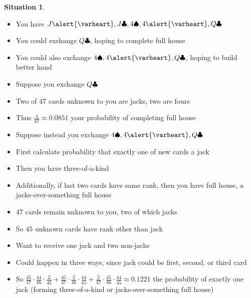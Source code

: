 \documentclass{beamer}
\theoremstyle{definition}
\newtheorem{situation}{Situation}
\newcommand{\hs}{\alert{\varheart}}
\newcommand{\s}{\spadesuit}
\newcommand{\cs}{\clubsuit}
\begin{document}
\begin{frame}
\begin{situation}
\begin{itemize}
\item You have $J\hs,J\cs,4\s,4\hs,Q\cs$
\item You could exchange $Q\cs$, hoping to complete full house
\item You could also exchange $4\s,4\hs,Q\cs$, hoping to build better hand
\end{itemize}
\end{situation}
\begin{itemize}
\item Suppose you exchange $Q\cs$
\item Two of $47$ cards unknown to you are jacks, two are fours
\item Thus $\frac{4}{47}\approx 0.0851$ your probability
of completing full house
\end{itemize}
\end{frame}

\begin{frame}
\begin{itemize}
\item Suppose instead you exchange $4\s,4\hs,Q\cs$
\item First calculate probability that exactly one of new cards
a jack
\item Then you have three-of-a-kind
\item Additionally, if last two cards have same rank,
then you have full house, a \alert{jacks-over-something full house}
\item $47$ cards remain unknown to you, two of which jacks
\item So $45$ unknown cards have rank other than jack
\item Want to receive one jack and two non-jacks
\item Could happen in three ways, since jack could be
first, second, or third card
\item So $\frac{45}{47}\cdot\frac{44}{46}\cdot\frac{2}{45}
+\frac{45}{47}\cdot\frac{2}{46}\cdot\frac{44}{45}
+\frac{2}{47}\cdot\frac{45}{46}\cdot\frac{44}{45}\approx 0.1221$
the probability of exactly one jack
(forming three-of-a-kind or jacks-over-something full house)
\end{itemize}
\end{frame}
\end{document}
